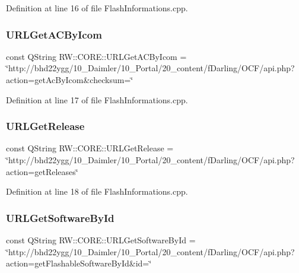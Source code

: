 Definition at line 16 of file Flash\+Informations.\+cpp.

\hypertarget{namespace_r_w_1_1_c_o_r_e_a604f5c85b6be2343ea0db0705d133142}{}\label{namespace_r_w_1_1_c_o_r_e_a604f5c85b6be2343ea0db0705d133142} 
\subsubsection{\texorpdfstring{U\+R\+L\+Get\+A\+C\+By\+Icom}{URLGetACByIcom}}
{\footnotesize\ttfamily const Q\+String R\+W\+::\+C\+O\+R\+E\+::\+U\+R\+L\+Get\+A\+C\+By\+Icom = \char`\"{}http\+://bhd22ygg/10\+\_\+\+Daimler/10\+\_\+\+Portal/20\+\_\+content/f\+Darling/\+O\+C\+F/api.\+php?action=get\+Ac\+By\+Icom\&checksum=\char`\"{}}



Definition at line 17 of file Flash\+Informations.\+cpp.

\hypertarget{namespace_r_w_1_1_c_o_r_e_ab79694a797ed6cedf35b6ce3768c1500}{}\label{namespace_r_w_1_1_c_o_r_e_ab79694a797ed6cedf35b6ce3768c1500} 
\subsubsection{\texorpdfstring{U\+R\+L\+Get\+Release}{URLGetRelease}}
{\footnotesize\ttfamily const Q\+String R\+W\+::\+C\+O\+R\+E\+::\+U\+R\+L\+Get\+Release = \char`\"{}http\+://bhd22ygg/10\+\_\+\+Daimler/10\+\_\+\+Portal/20\+\_\+content/f\+Darling/\+O\+C\+F/api.\+php?action=get\+Releases\char`\"{}}



Definition at line 18 of file Flash\+Informations.\+cpp.

\hypertarget{namespace_r_w_1_1_c_o_r_e_acb2b7235cefee05dcfb0b11fb9b120f0}{}\label{namespace_r_w_1_1_c_o_r_e_acb2b7235cefee05dcfb0b11fb9b120f0} 
\subsubsection{\texorpdfstring{U\+R\+L\+Get\+Software\+By\+Id}{URLGetSoftwareById}}
{\footnotesize\ttfamily const Q\+String R\+W\+::\+C\+O\+R\+E\+::\+U\+R\+L\+Get\+Software\+By\+Id = \char`\"{}http\+://bhd22ygg/10\+\_\+\+Daimler/10\+\_\+\+Portal/20\+\_\+content/f\+Darling/\+O\+C\+F/api.\+php?action=get\+Flashable\+Software\+By\+Id\&id=\char`\"{}}



